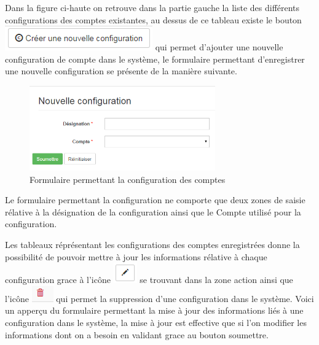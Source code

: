 \documentclass[12pt,a4paper]{report}
\begin{document}
Dans la figure ci-haute on retrouve dans la partie gauche la liste des différents configurations des comptes existantes, au dessus de ce tableau existe le bouton \includegraphics[scale=1]{pic/NewConfigComP.png} qui permet d'ajouter une nouvelle configuration de compte dans le système, le formulaire permettant d'enregistrer une nouvelle configuration se présente de la manière suivante.

\begin{figure}[h]
\begin{center}
\includegraphics[width=8cm]{pic/NewConfigCPF.png}
\end{center}
\caption{Formulaire permettant la configuration des comptes}
\label{Formulaire permettant la configuration des comptes}
\end{figure} 

Le formulaire permettant la configuration ne comporte que deux zones de saisie rélative à la désignation de la configuration ainsi que le Compte utilisé pour la configuration. 

Les tableaux réprésentant les configurations des comptes enregistrées donne la possibilité de pouvoir mettre à jour les informations rélative à chaque configuration grace à l'icône \includegraphics[scale=0.7]{pic/EditBlack.png} se trouvant dans la zone action ainsi que l'icône \includegraphics[scale=0.7]{pic/DeleteWRed.png} qui permet la suppression d'une configuration dans le système.
Voici un apperçu du formulaire permettant la mise à jour des informations liés à une configuration dans le système, la mise à jour est effective que si l'on modifier les informations dont on a besoin en validant grace au bouton soumettre. 
\end{document}
